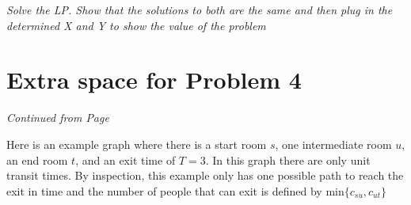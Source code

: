 \documentclass[11pt]{article}
\begin{document}
\emph{Solve the LP. Show that the solutions to both are the same and then plug
in the determined X and Y to show the value of the problem}

 
 
% 
% 
%
\newpage
 
\section*{Extra space for Problem 4}
\emph{Continued from Page \pageref{pg:end-of-p4}}

Here is an example graph where there is a start room $s$, one intermediate room
$u$, an end room $t$, and an exit time of $T=3$. In this graph there are only 
unit transit times. By inspection, this example only has one possible path to
reach the exit in time and the number of people that can exit is defined by 
$\mbox{min}\{c_{su},c_{ut}\}$

{
\centering
{}\par
}
\end{document}
